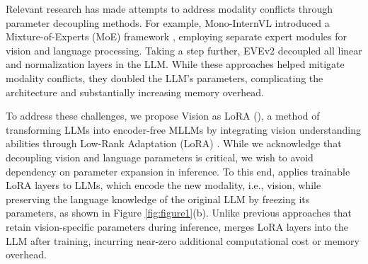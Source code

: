 Relevant research \cite{evev2, monointernvl} has made attempts to address modality conflicts through parameter decoupling methods.
For example, Mono-InternVL \cite{monointernvl} introduced a Mixture-of-Experts (MoE) framework \cite{moe}, employing separate expert modules for vision and language processing. Taking a step further, EVEv2 \cite{evev2} decoupled all linear and normalization layers in the LLM. While these approaches helped mitigate modality conflicts, they doubled the LLM’s parameters, complicating the architecture and substantially increasing memory overhead.

To address these challenges, we propose Vision as LoRA (\model{}), a method of transforming LLMs into encoder-free MLLMs by integrating vision understanding abilities through Low-Rank Adaptation (LoRA) \cite{lora}. 
While we acknowledge that decoupling vision and language parameters is critical, we wish to avoid dependency on parameter expansion in inference. To this end, \model{} applies trainable LoRA layers to LLMs, which encode the new modality, i.e., vision, while preserving the language knowledge of the original LLM by freezing its parameters, as shown in Figure \ref{fig:figure1}(b). Unlike previous approaches \cite{evev2, monointernvl} that retain vision-specific parameters during inference, \model{} merges LoRA layers into the LLM  after training, incurring near-zero additional computational cost or memory overhead.

